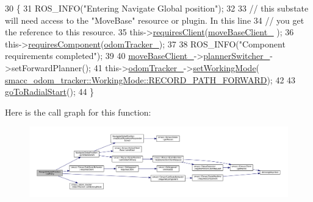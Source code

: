 \begin{DoxyCode}
30   \{
31     ROS\_INFO(\textcolor{stringliteral}{"Entering Navigate Global position"});
32 
33     \textcolor{comment}{// this substate will need access to the "MoveBase" resource or plugin. In this line}
34     \textcolor{comment}{// you get the reference to this resource.}
35     this->\hyperlink{classsmacc_1_1SmaccSubStateBehavior_ae8361a9e794b02f9f3d962b881e4fd7d}{requiresClient}(\hyperlink{classNavigateGlobalPosition_a1fdbaa1d3924509637a53b991d195670}{moveBaseClient\_} );
36     this->\hyperlink{classsmacc_1_1SmaccSubStateBehavior_a9f31f62f886cc06017e92fa0d834b12d}{requiresComponent}(\hyperlink{classNavigateGlobalPosition_a7bec01b571fac3c04008b7fab84dfb3d}{odomTracker\_});
37     
38     ROS\_INFO(\textcolor{stringliteral}{"Component requirements completed"});
39 
40     \hyperlink{classNavigateGlobalPosition_a1fdbaa1d3924509637a53b991d195670}{moveBaseClient\_}->\hyperlink{classsmacc_1_1SmaccMoveBaseActionClient_ae24164268108abf0b35cf51bfba5ec67}{plannerSwitcher\_}->setForwardPlanner();
41     this->\hyperlink{classNavigateGlobalPosition_a7bec01b571fac3c04008b7fab84dfb3d}{odomTracker\_}->\hyperlink{classsmacc__odom__tracker_1_1OdomTracker_a38fbca999297c46dc95628cc60851a45}{setWorkingMode}(
      \hyperlink{namespacesmacc__odom__tracker_ade9730dd5cc10ccfad9362176cf46c33a989d06a586bcf9520889228da7faa643}{smacc\_odom\_tracker::WorkingMode::RECORD\_PATH\_FORWARD});
42 
43     \hyperlink{classNavigateGlobalPosition_a5181e70601da336334f25a95840fd878}{goToRadialStart}(); 
44   \}
\end{DoxyCode}


Here is the call graph for this function\+:
\nopagebreak
\begin{figure}[H]
\begin{center}
\leavevmode
\includegraphics[width=350pt]{classNavigateGlobalPosition_a80962ce5bba51285565e360872f58c47_cgraph}
\end{center}
\end{figure}


